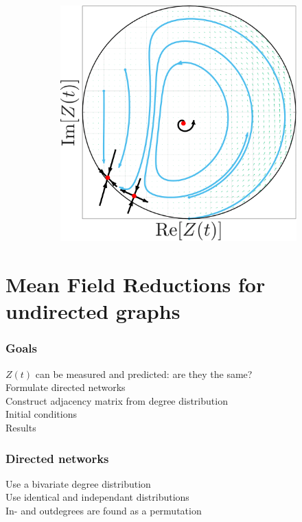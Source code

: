 \begin{frame}
\begin{figure}[H]
\begin{subfigure}[b]{0.32\linewidth}
   \label{fig:MFRPSS}
\end{subfigure} \hfill
\begin{subfigure}[b]{0.32\linewidth}
   \centering
  \includegraphics[width=\linewidth]{../Figures/PhaseSpace/MFRCPW.pdf}
   \label{fig:MFRCPW}
\end{subfigure}
   \label{fig:macroscopicstatesfixeddegree}
\end{figure}
\end{frame}

\section{\mywork Mean Field Reductions for undirected graphs} 
\begin{frame}
\frametitle{Goals} 
$Z(t)$ can be measured and predicted: are they the same? \\
\tabitem Formulate directed networks \\
\tabitem Construct adjacency matrix from degree distribution \\
\tabitem Initial conditions \\
\tabitem Results \\
\end{frame}

\begin{frame}
\frametitle{Directed networks} 
Use a bivariate degree distribution\\
\tabitem Use identical and independant distributions \\
\tabitem In- and outdegrees are found as a permutation
\end{frame}

